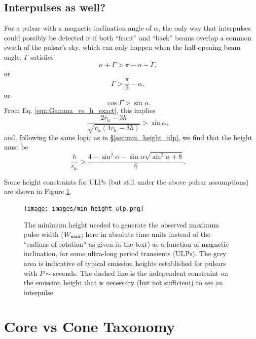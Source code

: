 \documentclass{book}
\newcommand{\rL}{r_\text{lc}} %
\begin{document}
\subsection{Interpulses as well?}

For a pulsar with a magnetic inclination angle of $\alpha$, the only way that interpulses could possibly be detected is if both ``front'' and ``back'' beams overlap a common swath of the pulsar's sky, which can only happen when the half-opening beam angle, $\Gamma$ satisfies
\begin{equation}
  \alpha + \Gamma > \pi - \alpha - \Gamma,
\end{equation}
or
\begin{equation}
  \Gamma > \frac{\pi}{2} - \alpha,
\end{equation}
or
\begin{equation}
  \cos\Gamma > \sin\alpha.
\end{equation}
From Eq. \eqref{eqn:Gamma_vs_h_exact}, this implies
\begin{equation}
  \frac{2\rL - 3h}{\sqrt{\rL(4\rL - 3h)}} > \sin\alpha,
\end{equation}
and, following the same logic as in \S\ref{sec:min_height_ulp}, we find that the height must be
\begin{equation}
  \frac{h}{\rL} > \frac{4 - \sin^2\alpha - \sin\alpha \sqrt{\sin^2\alpha + 8}}{6}.
\end{equation}

Some height constraints for ULPs (but still under the above pulsar assumptions) are shown in Figure \ref{fig:min_height_ulp}.
\begin{figure}[th]
    \centering
    \texttt{[image: images/min\_height\_ulp.png]}
    \caption{The minimum height needed to generate the observed maximum pulse width ($W_{\rm max}$; here in absolute time units instead of the ``radians of rotation'' as given in the text) as a function of magnetic inclination, for some ultra-long period transients (ULPs). The grey area is indicative of typical emission heights established for pulsars with $P{\sim}$seconds. The dashed line is the independent constraint on the emission height that is necessary (but not sufficient) to see an interpulse.}
    \label{fig:min_height_ulp}
\end{figure}


\section{Core vs Cone Taxonomy}
\end{document}
